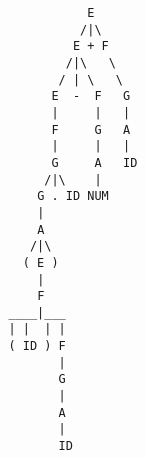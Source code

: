 \begin{verbatim}
              E
             /|\
            E + F
           /|\   \
          / | \   \
         E  -  F   G
         |     |   |
         F     G   A
         |     |   |
         G     A   ID
        /|\    |
       G . ID NUM
       |
       A
      /|\
     ( E )
       |
       F
   ____|___
   | |  | |
   ( ID ) F
          |
          G
          |
          A
          |
          ID
\end{verbatim}

\subsection{}

